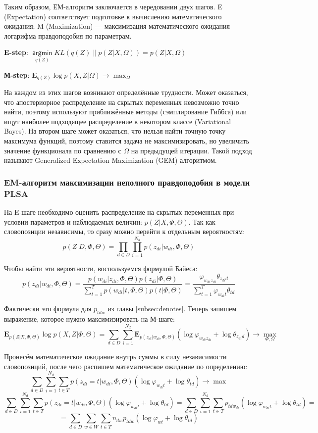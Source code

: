 \documentclass[12pt]{article}
\renewcommand{\phi}{\varphi}
\newcommand{\argmin}{\mathop{\mathsf{argmin}}\limits}
\begin{document}
Таким образом, ЕМ-алгоритм заключается в чередовании двух шагов. E (Expectation) соответствует подготовке к вычислению математического ожидания; M (Maximization) --- максимизация математического ожидания логарифма правдоподобия по параметрам.

\textbf{E-step}: $\argmin_{q(Z)} KL(q(Z)\|p(Z|X,\Omega)) = p(Z|X, \Omega)$

\textbf{М-step}: $\mathbf{E}_{q(Z)} \log p(X, Z|\Omega) \to \max_{\Omega}$

На каждом из этих шагов возникают определённые трудности.  Может оказаться, что апостериорное распределение на скрытых переменных невозможно точно найти, поэтому используют приближённые методы (сэмплирование Гиббса) или ищут наиболее подходящее распределение в некотором классе (Variational Bayes). На втором шаге может оказаться, что нельзя найти точную точку максимума функций, поэтому ставится задача не максимизировать, но увеличить значение функционала по сравнению с $\Omega$ на предыдущей итерации. Такой подход называют Generalized Expectation Maximization (GEM) алгоритмом.

\subsubsection{EM-алгоритм максимизации неполного правдоподобия в модели PLSA}

На E-шаге необходимо оценить распределение на скрытых переменных при условии параметров и  наблюдаемых величин: $p(Z|X,\Phi,\Theta)$. Так как словопозиции независимы, то сразу можно перейти к отдельным вероятностям:
\[
p(Z|D,\Phi, \Theta) = \prod\limits_{d \in D} \prod\limits_{i=1}^{N_d} p(z_{di}|w_{di}, \Phi, \Theta)
\]

Чтобы найти эти вероятности, воспользуемся формулой Байеса:
\[
p(z_{di}|w_{di}, \Phi, \Theta) = \frac{p(w_{di}|z_{di}, \Phi, \Theta)p(z_{di}|\Phi,\Theta)}{\sum_{t=1}^T p(w_{di}|t, \Phi, \Theta)p(t|\Phi,\Theta)}
= \frac{\phi_{w_{di} z_{di}} \theta_{z_{di} d}}{\sum_{t=1}^T \phi_{w_{di}t} \theta_{td}}
\]

Фактически это формула для $p_{tdw}$ из главы \ref{subsec:denotes}. Теперь запишем выражение, которое нужно максимизировать на М-шаге:
\[
\mathbf{E}_{p(Z|X,\Phi, \Theta)} \log p(X,Z|\Phi,\Theta) = \sum_{d \in D} \sum_{i=1}^{N_d} \mathbf{E}_{p(z_{di}|w_{di}, \Phi, \Theta)} (\log \phi_{w_{di} z_{di}} + \log \theta_{z_{di} d}) \to \max\limits_{\Phi, \Omega}
\]

Пронесём математическое ожидание внутрь суммы в силу независимости словопозиций, после чего распишем математическое ожидание по определению:
\[
\sum_{d\in D}\sum_{i=1}^{N_d} \sum_{t \in T} p(z_{di}=t|w_{di},\Phi,\Theta) (\log \phi_{w_{di} t} + \log \theta_{td}) \to \max
\]
\[
\sum_{d\in D}\sum_{i=1}^{N_d} \sum_{t \in T} p(z_{di}=t|w_{di},\Phi,\Theta) (\log \phi_{w_{di} t} + \log \theta_{td}) =
\sum_{d\in D}\sum_{i=1}^{N_d} \sum_{t \in T} p_{tdw_{di}} (\log \phi_{w_{di} t} + \log \theta_{td}) =
\]
\[
=
\sum_{d\in D}\sum_{w \in W} \sum_{t \in T} n_{dw} p_{tdw} (\log \phi_{wt} + \log \theta_{td}) 
\]
\end{document}
